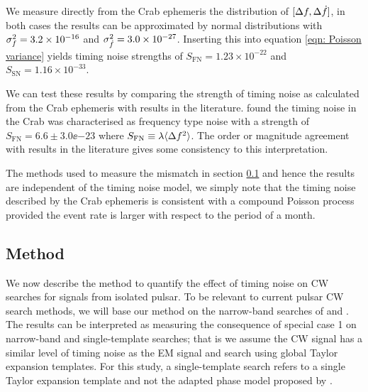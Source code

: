 \documentclass[../full_thesis/full_thesis.tex]{subfiles}
\begin{document}

We measure directly from the Crab ephemeris the distribution of
$[\Delta f,\Delta\dot{f}]$, in both  cases the results can be approximated by
normal distributions with $\sigma_{f}^{2}=3.2\times10^{-16}$ and
$\sigma_{\dot{f}}^{2}=3.0\times10^{-27}$. Inserting this into equation
\eqref{eqn: Poisson variance} yields timing noise strengths of
$S_{\textrm{FN}}=1.23\times10^{-22}$ and $S_{\textrm{SN}}=1.16\times10^{-33}$.

We can test these results by comparing the strength of timing noise as
calculated from the Crab ephemeris with results in the literature.
\citet{Cordes1981} found the timing noise in the Crab was characterised  as
frequency type noise with a strength of $S_{\textrm{FN}}=6.6 \pm 3.0 \ee{-23}$
where $S_{\textrm{FN}} \equiv \lambda \langle\Delta f^{2}\rangle$.  The order
or magnitude agreement with results in the literature gives some consistency to
this interpretation.

The methods used to measure the mismatch in section \ref{sec: narrow-band method} and hence
the results are independent of the timing noise model, we simply note that the
timing noise described by the Crab ephemeris is consistent with a compound
Poisson process provided the event rate is larger with respect to the period of
a month.

\subsection{Method}
\label{sec: narrow-band method}
We now describe the method to quantify the effect of timing noise on CW
searches for signals from isolated pulsar. 
To be relevant to current pulsar CW search methods, we will base our
method on the narrow-band searches of \citet{LIGO2008} and \citet{LIGO2015}. The results can be interpreted as measuring the consequence of
special case 1 on narrow-band and single-template searches; that is we assume
the CW signal has a similar level of timing noise as the EM signal and search
using global Taylor expansion templates. For this study, a single-template
search refers to a single Taylor expansion template and not the adapted phase
model proposed by \citet{Pitkin2004}. 
\end{document}

